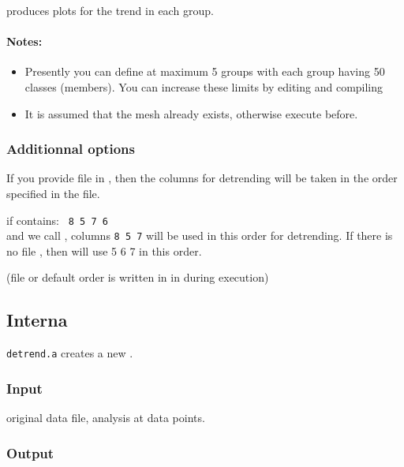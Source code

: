  produces plots for the trend in each group.


\paragraph{Notes:} 
\begin{itemize}
\item Presently you can define at maximum 5 groups with each group having 50 classes (members). You can increase these limits by editing and compiling 
\item It is assumed that the mesh already exists, otherwise execute  before.
\end{itemize}

\subsubsection{Additionnal options}

If you provide file  in , then the columns for detrending will be taken in the order 
specified in the file. 

\example if  contains:
\texttt{
8 5 7 6
}\\
and we call , columns \texttt{8 5 7} will be used in this order for detrending. If there is no file , then  will use 5 6 7 in this order.

(file  or default order is written in  in  during execution)

\subsection{Interna}	%

\texttt{detrend.a} creates a new .  

\subsubsection{Input}

 original data file,  analysis at data points. 
 
\subsubsection{Output}

